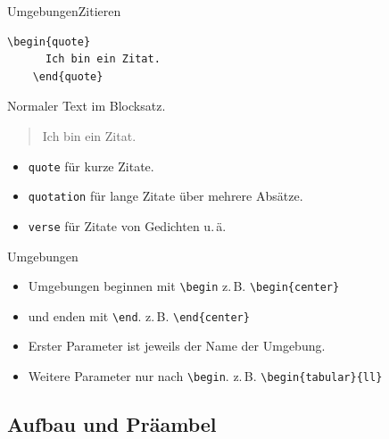 \begin{Frame}[fragile]{Umgebungen}{Zitieren}
  \begin{lstlisting}[gobble=4]
    \begin{quote}
      Ich bin ein Zitat.
    \end{quote}
  \end{lstlisting}

  \xxx

  \begin{minipage}{\textwidth}
    Normaler Text im Blocksatz.
    \lorem
  \end{minipage}

  \begin{quote}
    Ich bin ein Zitat. \lorem
  \end{quote}

  \pause

  \begin{itemize}
    \item \lstinline-quote- für \alert{kurze Zitate}.
    \item \lstinline-quotation- für \alert{lange Zitate} über mehrere Absätze.
    \item \lstinline-verse- für Zitate von \alert{Gedichten} u.\,ä.
  \end{itemize}
\end{Frame}

\begin{Frame}[fragile]{Umgebungen}
  \begin{itemize}
    \item Umgebungen beginnen mit \lstinline-\begin-\newline
      z.\,B. \lstinline-\begin{center}-
    \item und enden mit \lstinline-\end-.\newline
      z.\,B. \lstinline-\end{center}-
    \item Erster Parameter ist jeweils der Name der Umgebung.
    \item Weitere Parameter nur nach \lstinline-\begin-.\newline
      z.\,B. \lstinline-\begin{tabular}{ll}-
  \end{itemize}
\end{Frame}

\subsection{Aufbau und Präambel}

